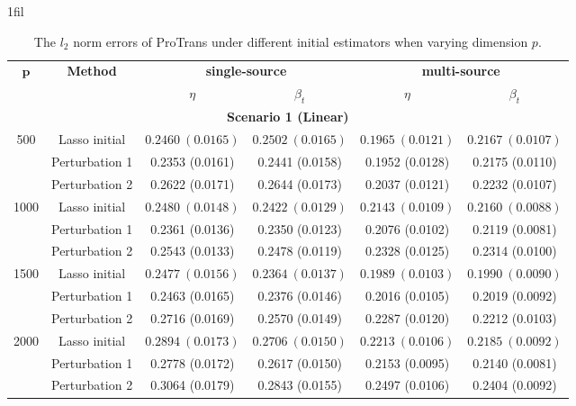 \documentclass[12pt]{article}
\makeatletter
\newcommand*{\centerfloat}{%
  \parindent \z@
  \leftskip \z@ \@plus 1fil \@minus \marginparwidth
  \rightskip \leftskip
  \parfillskip \z@skip}
\makeatother
\begin{document}
\begin{table}[!ht]
\renewcommand{\arraystretch}{0.6}
\footnotesize
\centerfloat
\caption{The $l_2$ norm errors of ProTrans under different initial estimators when varying dimension $p$.}
\label{tab:our_only_vary_p_l2}
    \begin{tabular}{cccccc}
        \toprule
        \multirow{2}{*}{$\bm{p}$} & \multirow{2}{*}{\textbf{Method}} & \multicolumn{2}{c}{\textbf{single-source}} & \multicolumn{2}{c}{\textbf{multi-source}}\\
        \cmidrule(lr){3-4} \cmidrule(lr){5-6} 
        & & $\eta$ & $\beta_{t}$ & $\eta$& $\beta_{t}$ \\
        \midrule
        \multicolumn{6}{c}{\textbf{Scenario 1 (Linear)}}\\
        \hline
        \multirow{3}{*}{500} 
        & Lasso initial & $0.2460\ (0.0165)$  & $0.2502\ (0.0165)$ & $0.1965\ (0.0121)$ & $0.2167\ (0.0107)$ \\ 
        & Perturbation 1 & 0.2353 (0.0161) &  0.2441 (0.0158) & 0.1952 (0.0128)  & 0.2175 (0.0110) \\ 
        & Perturbation 2  & 0.2622 (0.0171)  & 0.2644 (0.0173) & 0.2037 (0.0121)  & 0.2232 (0.0107) \\
        \hline
        \multirow{3}{*}{1000} 
        & Lasso initial & $0.2480\ (0.0148)$  & $0.2422\ (0.0129)$ & $0.2143\ (0.0109)$ & $0.2160\ (0.0088)$ \\ 
        & Perturbation 1  & 0.2361 (0.0136) & 0.2350 (0.0123) & 0.2076 (0.0102)  & 0.2119 (0.0081) \\ 
        & Perturbation 2   & 0.2543 (0.0133)& 0.2478 (0.0119)& 0.2328 (0.0125) & 0.2314 (0.0100) \\
        \hline
        \multirow{3}{*}{1500} 
        & Lasso initial & $0.2477\ (0.0156)$  & $0.2364\ (0.0137) $ & $0.1989\ (0.0103) $ & $0.1990\ (0.0090)$ \\ 
        & Perturbation 1 & 0.2463 (0.0165)  & 0.2376 (0.0146) & 0.2016 (0.0105) & 0.2019 (0.0092) \\ 
        & Perturbation 2   & 0.2716 (0.0169)  & 0.2570 (0.0149)& 0.2287 (0.0120) & 0.2212 (0.0103) \\
        \hline
        \multirow{3}{*}{2000} 
        & Lasso initial & $0.2894\ (0.0173)$  & $0.2706\ (0.0150)$ & $0.2213\ (0.0106)$ & $0.2185\ (0.0092)$ \\ 
        & Perturbation 1 & 0.2778 (0.0172) & 0.2617 (0.0150)& 0.2153 (0.0095) & 0.2140 (0.0081)  \\ 
        & Perturbation 2   & 0.3064 (0.0179)  & 0.2843 (0.0155)& 0.2497 (0.0106)& 0.2404 (0.0092) \\

\end{tabular}
\end{table}
\end{document}
